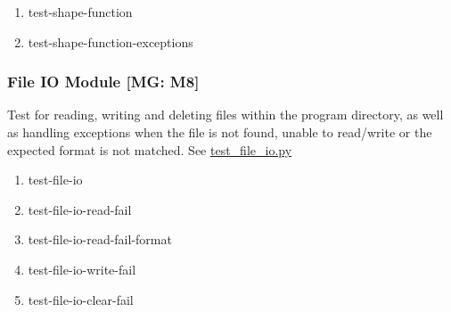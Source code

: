 \documentclass[12pt, titlepage]{article}
\begin{document}
\begin{enumerate}
  \item test-shape-function
  \item test-shape-function-exceptions
\end{enumerate}

\subsubsection{File IO Module [MG: M8]} \label{UT:FileIO}
Test for reading, writing and deleting files within the program directory, as well as handling exceptions when the file is not found, unable to read/write or the expected format is not matched. See \href{https://github.com/omltcat/turbulent-flow/blob/main/test/test_file_io.py}{test\_file\_io.py}

\begin{enumerate}
  \item test-file-io
  \item test-file-io-read-fail
  \item test-file-io-read-fail-format
  \item test-file-io-write-fail
  \item test-file-io-clear-fail
\end{enumerate}





		


					
\end{document}
